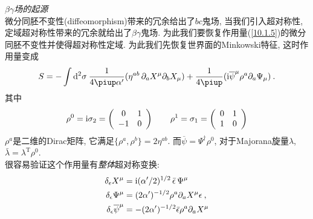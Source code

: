 \begin{framed}
{\Large{\emph{{$\beta\gamma$场的起源}}}}\\

微分同胚不变性(diffeomorphism)带来的冗余给出了$bc$鬼场, 当我们引入超对称性, 定域超对称性带来的冗余就给出了$\beta\gamma$鬼场. 为此我们要恢复作用量(\ref{10.1.5})的微分同胚不变性并使得超对称性定域.
为此我们先恢复世界面的Minkowski特征, 这时作用量变成
\begin{equation*}
    S=-\int\dif^{2}\sigma\:\frac{1}{4\uppi\alpha^{\prime}}(
    \eta^{ab}\,\partial_{a}X^{\mu}\partial_{b}X_{\mu})
    +\frac{1}{4\uppi}(\mi\overline{\psi}^{\mu}\rho^{a}\partial_{a}\Psi_{\mu})\:.
\end{equation*}
其中
\begin{equation*}
    \rho^{0}=\mathrm{i}\sigma_{2}=
    \left(\begin{array}{cc}
         0&1  \\
         -1&0 
    \end{array}\right) \qquad
    \rho^{1}=\sigma_{1}=
    \left(\begin{array}{cc}
         0&1  \\
         1&0 
    \end{array}\right)
\end{equation*}
$\rho^{a}$是二维的Dirac矩阵, 它满足$\{\rho^{a},\rho^{b}\}=2\eta^{ab}$. 而$\overline{\psi}=\Psi^{\dag}\rho^{0}$, 对于Majorana旋量$\lambda$, $\bar{\lambda}=\lambda^{\mathrm{T}}\rho^{0}$.
\\
很容易验证这个作用量有{\emph{整体}}超对称变换:
\begin{align*}
    \delta_{\epsilon}X^{\mu}&=\mathrm{i}(\alpha^{\prime}/2)^{1/2}\,\bar{\epsilon}\,\Psi^{\mu} \\
    \delta_{\epsilon}\Psi^{\mu}&=(2\alpha^{\prime})^{-1/2}\rho^{a}\partial_{a}X^{\mu}\epsilon\:, \\
    \delta _{\epsilon }\overline{\psi}^{\mu }&=-(2\alpha ^{\prime })^{-1/2}\bar{\epsilon}\rho ^{a}\partial _{a}X^{\mu }
\end{align*}


\end{framed}
